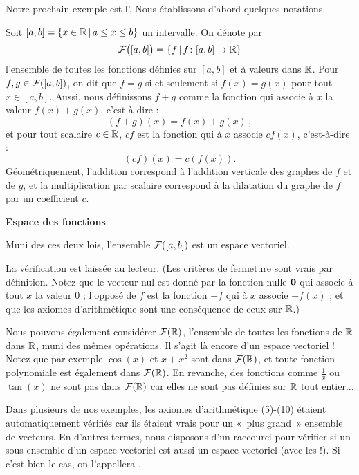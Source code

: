 Notre prochain exemple est l'.  Nous établissons d'abord quelques notations.

\begin{definition}
Soit $[a,b]=\{x \in \mathbb{R} \,|\, a \leq x \leq b\}$ un intervalle.
On dénote par
$$
\mathcal{F}\big([a,b]\big) = \{ f \,|\, f \colon [a,b] \to \mathbb{R}\}
$$
 l'ensemble de toutes les fonctions définies sur $[a,b]$ et à valeurs dans $\mathbb{R}$.
Pour $f,g \in \mathcal{F}([a,b])$, on dit que $f=g$ si et seulement si $f(x)=g(x)$ 
pour tout $x\in [a,b]$.  Aussi, nous définissons $f+g$ comme la fonction
qui associe à $x$ la valeur $f(x)+g(x)$, c'est-à-dire :
$$
(f+g)(x) = f(x) + g(x)\,,
$$
et pour tout scalaire $c \in \mathbb{R}$, $cf$ est la fonction qui  à $x$ associe
$cf(x)$, c'est-à-dire :
$$
(cf)(x) = c(f(x)).
$$
Géométriquement, l'addition correspond à l'addition verticale des graphes de $f$ et de $g$, et la multiplication par scalaire correspond à la dilatation du graphe de $f$ par un coefficient $c$.
\end{definition}

\begin{myexample} {\bf Espace des fonctions}

Muni des ces deux lois, l'ensemble $\mathcal{F}([a,b])$ est un espace vectoriel.

La vérification est laiss\'ee au lecteur.   
(Les crit\`eres de fermeture sont vrais par définition.
Notez que le vecteur nul est donné par la fonction nulle $\mathbf{0}$ qui associe à tout $x$ la valeur $0$ ; l'oppos\'e de $f$ est la fonction $-f$ qui à $x$ associe $-f(x)$ ; et que les axiomes d'arithmétique sont une conséquence de ceux sur $\mathbb{R}$.)
\end{myexample}

\begin{myexample} Nous pouvons également considérer $\mathcal{F}(\mathbb{R})$, l'ensemble de toutes les fonctions
de $\mathbb{R}$ dans $\mathbb{R}$, muni des mêmes opérations. Il s'agit là encore d'un espace vectoriel !
Notez que par exemple $\cos(x)$ et $x+x^2$ sont dans $\mathcal{F}(\mathbb{R})$, et toute fonction polynomiale est également dans $\mathcal{F}(\mathbb{R})$. En revanche, des fonctions comme 
$\frac{1}{x}$ ou $\tan(x)$ ne sont pas dans $\mathcal{F}(\mathbb{R})$ car elles ne sont pas
définies sur $\mathbb{R}$ tout entier...   
\end{myexample}

Dans plusieurs de nos exemples, les axiomes d'arithmétique (5)-(10) étaient automatiquement vérifiés 
car ils étaient vrais pour un «~plus grand~» ensemble de vecteurs. En d'autres termes, nous disposons d'un raccourci pour vérifier si
un sous-ensemble d'un espace vectoriel est aussi
un espace vectoriel (avec les  !). Si c'est bien le cas, on l'appellera .





